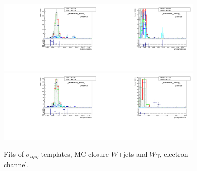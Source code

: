 \begin{figure}[htb]
\begin{center}
   \includegraphics[width=0.45\textwidth]{../figs/figs_v11/ELECTRON_WGamma/MCclosureWjetsPlusWg/c_TEMPL_SIHIH_UNblind__phoEt55to65__Barrel__RooFit_MCclosure.pdf}\includegraphics[width=0.45\textwidth]{../figs/figs_v11/ELECTRON_WGamma/MCclosureWjetsPlusWg/c_TEMPL_SIHIH_UNblind__phoEt55to65__Endcap__RooFit_MCclosure.pdf}\\
   \includegraphics[width=0.45\textwidth]{../figs/figs_v11/ELECTRON_WGamma/MCclosureWjetsPlusWg/c_TEMPL_SIHIH_UNblind__phoEt65to75__Barrel__RooFit_MCclosure.pdf}\includegraphics[width=0.45\textwidth]{../figs/figs_v11/ELECTRON_WGamma/MCclosureWjetsPlusWg/c_TEMPL_SIHIH_UNblind__phoEt65to75__Endcap__RooFit_MCclosure.pdf}\\
  \label{fig:templateFits_MCclosureWjetsPlusWg_SIHIH_ELECTRON_2}
  \caption{Fits of $\sigma_{i \eta i \eta}$ templates, MC closure $W$+jets and $W\gamma$, electron channel.}
  \end{center}
\end{figure}

